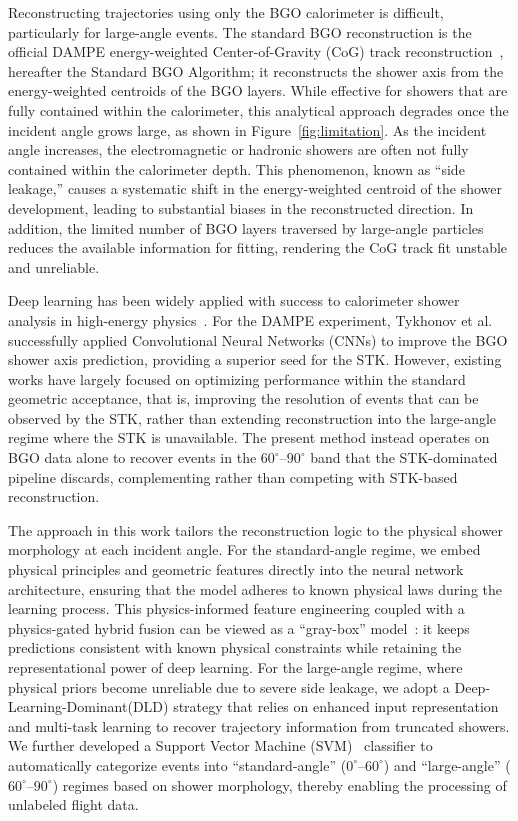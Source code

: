 \documentclass[preprint,12pt]{elsarticle}
\begin{document}
Reconstructing trajectories using only the BGO calorimeter is difficult, particularly for large-angle events. The standard BGO reconstruction is the official DAMPE energy-weighted Center-of-Gravity (CoG) track reconstruction~\cite{dampe_bgo_reco_status, lei_2019}, hereafter the Standard BGO Algorithm; it reconstructs the shower axis from the energy-weighted centroids of the BGO layers. While effective for showers that are fully contained within the calorimeter, this analytical approach degrades once the incident angle grows large, as shown in Figure~\ref{fig:limitation}. As the incident angle increases, the electromagnetic or hadronic showers are often not fully contained within the calorimeter depth. This phenomenon, known as ``side leakage,'' causes a systematic shift in the energy-weighted centroid of the shower development, leading to substantial biases in the reconstructed direction. In addition, the limited number of BGO layers traversed by large-angle particles reduces the available information for fitting, rendering the CoG track fit unstable and unreliable.

Deep learning has been widely applied with success to calorimeter shower analysis in high-energy physics~\cite{paganini_2018, erdmann_2018, guillen_2019, yang_2024, carleo_2019, seyyedi_2023, meng_2025, lecun_2015}. For the DAMPE experiment, Tykhonov et al.~\cite{tykhonov_2023} successfully applied Convolutional Neural Networks (CNNs) to improve the BGO shower axis prediction, providing a superior seed for the STK. However, existing works have largely focused on optimizing performance within the standard geometric acceptance, that is, improving the resolution of events that can be observed by the STK, rather than extending reconstruction into the large-angle regime where the STK is unavailable. The present method instead operates on BGO data alone to recover events in the $60^{\circ}$--$90^{\circ}$ band that the STK-dominated pipeline discards, complementing rather than competing with STK-based reconstruction.

The approach in this work tailors the reconstruction logic to the physical shower morphology at each incident angle. For the standard-angle regime, we embed physical principles and geometric features directly into the neural network architecture, ensuring that the model adheres to known physical laws during the learning process. This physics-informed feature engineering coupled with a physics-gated hybrid fusion can be viewed as a ``gray-box'' model~\cite{karpatne_2017, kerrigan_2021, karniadakis_2021, willard_2022}: it keeps predictions consistent with known physical constraints while retaining the representational power of deep learning. For the large-angle regime, where physical priors become unreliable due to severe side leakage, we adopt a Deep-Learning-Dominant(DLD) strategy that relies on enhanced input representation and multi-task learning to recover trajectory information from truncated showers. We further developed a Support Vector Machine (SVM)~\cite{cortes_1995} classifier to automatically categorize events into ``standard-angle'' ($0^{\circ}$--$60^{\circ}$) and ``large-angle'' ($60^{\circ}$--$90^{\circ}$) regimes based on shower morphology, thereby enabling the processing of unlabeled flight data.
\end{document}
